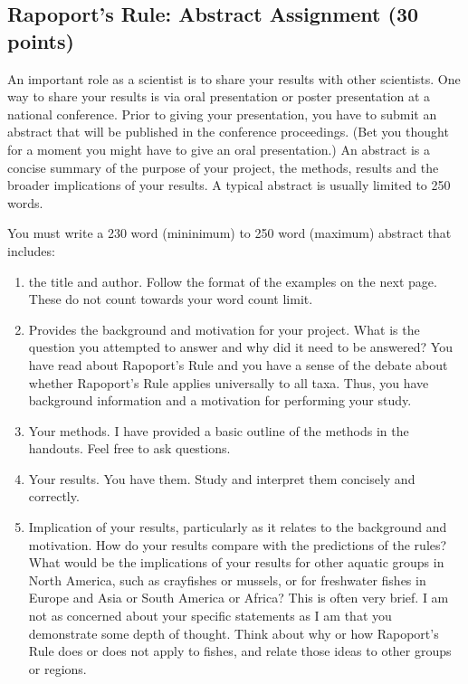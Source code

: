 \documentclass[11pt]{article}
\begin{document}
\thispagestyle{first_page}

\subsection*{Rapoport's Rule: Abstract Assignment (30 points)}

An important role as a scientist is to share your results with other
scientists. One way to share your results is via oral presentation or
poster presentation at a national conference. Prior to giving your
presentation, you have to submit an abstract that will be published in
the conference proceedings. (Bet you thought for a moment you might have
to give an oral presentation.) An abstract is a concise summary of the
purpose of your project, the methods, results and the broader
implications of your results. A typical abstract is usually limited to
250 words.

You must write a 230 word (mininimum) to 250 word (maximum) abstract 
that includes:

\begin{enumerate}
	\item the title and author. Follow the format of the examples on the next page.
	These do not count towards your word count limit.

	\item Provides the background and motivation for your project. What
	is the question you attempted to answer and why did it need to be
	answered? You have read about Rapoport's Rule and you have a sense of
	the debate about whether Rapoport's Rule applies universally to all
	taxa. Thus, you have background information and a motivation for
	performing your study.

	\item Your methods. I have provided a basic outline of the methods
	in the handouts. Feel free to ask questions.

	\item Your results. You have them. Study and interpret them
	concisely and correctly.

	\item Implication of your results, particularly as it relates to
	the background and motivation. How do your results compare with the
	predictions of the rules? What would be the implications of your results
	for other aquatic groups in North America, such as crayfishes or
	mussels, or for freshwater fishes in Europe and Asia or South America or
	Africa? This is often very brief. I am not as concerned about your
	specific statements as I am that you demonstrate some depth of thought.
	Think about why or how Rapoport's Rule does or does not apply to fishes,
	and relate those ideas to other groups or regions.

\end{enumerate}
\end{document}
